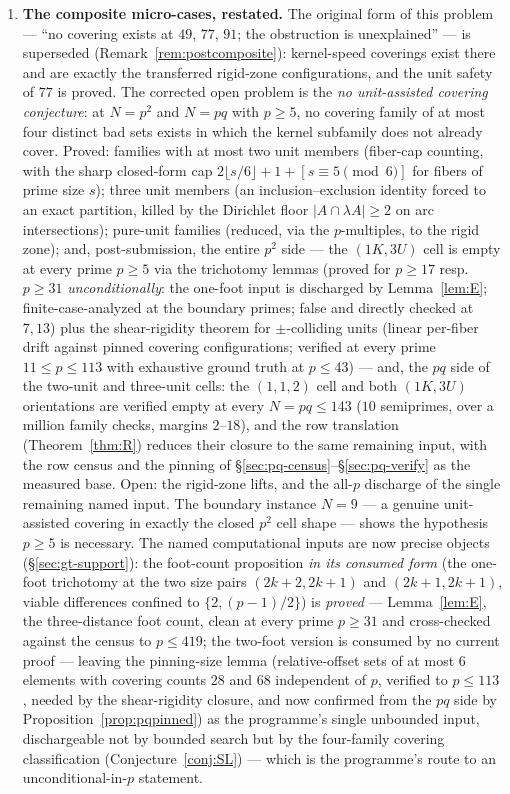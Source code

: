 \documentclass[11pt,a4paper]{article}
\numberwithin{equation}{section}
\theoremstyle{plain}
\theoremstyle{plain}
\theoremstyle{definition}
\theoremstyle{remark}
\begin{document}
\begin{enumerate}[leftmargin=1.7em,itemsep=4pt]
\item \textbf{The composite micro-cases, restated.} The original form of
  this problem --- ``no covering exists at $49$, $77$, $91$; the
  obstruction is unexplained'' --- is superseded
  (Remark~\ref{rem:postcomposite}): kernel-speed coverings exist there and
  are exactly the transferred rigid-zone configurations, and the unit
  safety of $77$ is proved. The corrected open problem is the \emph{no
  unit-assisted covering conjecture}: at $N=p^2$ and $N=pq$ with $p\ge5$,
  no covering family of at most four distinct bad sets exists in which the
  kernel subfamily does not already cover. Proved: families with at most
  two unit members (fiber-cap counting, with the sharp closed-form cap
  $2\lfloor s/6\rfloor+1+[s\equiv5\pmod6]$ for fibers of prime size $s$);
  three unit members (an inclusion--exclusion identity forced to an exact
  partition, killed by the Dirichlet floor $|A\cap\lambda A|\ge2$ on arc
  intersections); pure-unit families (reduced, via the $p$-multiples,
  to the rigid zone); and, post-submission, the entire $p^2$ side --- the
  $(1K,3U)$ cell is empty at every prime $p\ge5$ via the trichotomy
  lemmas (proved for $p\ge17$ resp.\ $p\ge31$ \emph{unconditionally}: the
  one-foot input is discharged by Lemma~\ref{lem:E}; finite-case-analyzed
  at the boundary primes; false and directly checked at $7,13$) plus the
  shear-rigidity theorem for $\pm$-colliding units
  (linear per-fiber drift against pinned covering configurations;
  verified at every prime $11\le p\le113$ with exhaustive ground truth at $p\le43$) --- and, the $pq$ side of
  the two-unit and three-unit cells: the $(1,1,2)$ cell and both
  $(1K,3U)$ orientations are verified empty at every $N=pq\le143$ ($10$
  semiprimes, over a million family checks, margins $2$--$18$), and the
  row translation (Theorem~\ref{thm:R}) reduces their closure to the same
  remaining input, with the row census and the pinning of
  \S\ref{sec:pq-census}--\S\ref{sec:pq-verify} as the measured base.
  Open: the rigid-zone lifts, and the all-$p$ discharge of the single
  remaining named input. The boundary
  instance $N=9$ --- a genuine unit-assisted covering in exactly the
  closed $p^2$ cell shape --- shows the hypothesis $p\ge5$ is necessary.
  The named computational inputs are now precise
  objects (\S\ref{sec:gt-support}): the foot-count proposition \emph{in
  its consumed form} (the one-foot trichotomy at the two size pairs
  $(2k{+}2,2k{+}1)$ and $(2k{+}1,2k{+}1)$, viable differences confined to
  $\{2,(p-1)/2\}$) is \emph{proved} --- Lemma~\ref{lem:E}, the
  three-distance foot count, clean at every prime $p\ge31$ and
  cross-checked against the census to $p\le419$; the two-foot version is
  consumed by no current proof --- leaving the
  pinning-size lemma (relative-offset sets of at most $6$ elements with
  covering counts $28$ and $68$ independent of $p$, verified to
  $p\le113$, needed by the shear-rigidity closure, and now confirmed from
  the $pq$ side by Proposition~\ref{prop:pqpinned}) as the programme's
  single unbounded input, dischargeable not by
  bounded search but by the four-family covering classification
  (Conjecture~\ref{conj:SL}) --- which is the programme's route to an
  unconditional-in-$p$ statement.


\end{enumerate}
\end{document}
